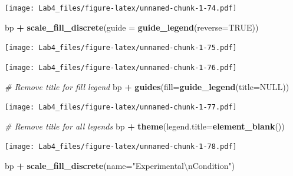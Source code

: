 \documentclass[]{article}
\newenvironment{Shaded}{\begin{snugshade}}{\end{snugshade}}
\newcommand{\KeywordTok}[1]{\textcolor[rgb]{0.13,0.29,0.53}{\textbf{#1}}}
\newcommand{\DataTypeTok}[1]{\textcolor[rgb]{0.13,0.29,0.53}{#1}}
\newcommand{\CharTok}[1]{\textcolor[rgb]{0.31,0.60,0.02}{#1}}
\newcommand{\StringTok}[1]{\textcolor[rgb]{0.31,0.60,0.02}{#1}}
\newcommand{\CommentTok}[1]{\textcolor[rgb]{0.56,0.35,0.01}{\textit{#1}}}
\newcommand{\OtherTok}[1]{\textcolor[rgb]{0.56,0.35,0.01}{#1}}
\newcommand{\OperatorTok}[1]{\textcolor[rgb]{0.81,0.36,0.00}{\textbf{#1}}}
\newcommand{\NormalTok}[1]{#1}
\begin{document}
\texttt{[image: Lab4\_files/figure-latex/unnamed-chunk-1-74.pdf]}

\begin{Shaded}
\begin{Highlighting}[]
\NormalTok{bp }\OperatorTok{+}\StringTok{ }\KeywordTok{scale_fill_discrete}\NormalTok{(}\DataTypeTok{guide =} \KeywordTok{guide_legend}\NormalTok{(}\DataTypeTok{reverse=}\OtherTok{TRUE}\NormalTok{))}
\end{Highlighting}
\end{Shaded}

\texttt{[image: Lab4\_files/figure-latex/unnamed-chunk-1-75.pdf]}

\begin{Shaded}
\end{Shaded}

\texttt{[image: Lab4\_files/figure-latex/unnamed-chunk-1-76.pdf]}

\begin{Shaded}
\begin{Highlighting}[]
\CommentTok{# Remove title for fill legend}
\NormalTok{bp }\OperatorTok{+}\StringTok{ }\KeywordTok{guides}\NormalTok{(}\DataTypeTok{fill=}\KeywordTok{guide_legend}\NormalTok{(}\DataTypeTok{title=}\OtherTok{NULL}\NormalTok{))}
\end{Highlighting}
\end{Shaded}

\texttt{[image: Lab4\_files/figure-latex/unnamed-chunk-1-77.pdf]}

\begin{Shaded}
\begin{Highlighting}[]
\CommentTok{# Remove title for all legends}
\NormalTok{bp }\OperatorTok{+}\StringTok{ }\KeywordTok{theme}\NormalTok{(}\DataTypeTok{legend.title=}\KeywordTok{element_blank}\NormalTok{())}
\end{Highlighting}
\end{Shaded}

\texttt{[image: Lab4\_files/figure-latex/unnamed-chunk-1-78.pdf]}

\begin{Shaded}
\begin{Highlighting}[]
\NormalTok{bp }\OperatorTok{+}\StringTok{ }\KeywordTok{scale_fill_discrete}\NormalTok{(}\DataTypeTok{name=}\StringTok{"Experimental}\CharTok{\textbackslash{}n}\StringTok{Condition"}\NormalTok{)}
\end{Highlighting}
\end{Shaded}
\end{document}
